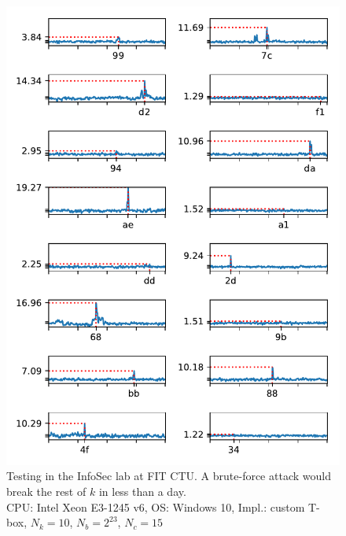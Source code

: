 \documentclass[thesis=B,english]{FITthesis}[2019/03/06]
\begin{document}
\begin{figure}
	\centering
	\includegraphics{full_tbox_xeon_success.pdf}
	\caption[Custom T-box on Windows in the lab]{Testing in the InfoSec lab at FIT CTU. A brute-force attack would break the rest of $k$ in less than a day. \\
	CPU: Intel Xeon E3-1245 v6, OS: Windows 10, Impl.: custom T-box, $N_k = 10$, $N_b = 2^{23}$, $N_c = 15$}
\end{figure}
\end{document}

